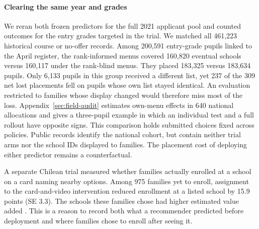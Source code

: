 \paragraph{Clearing the same year and grades}
We reran both frozen predictors for the full 2021 applicant pool and counted outcomes for the entry grades targeted in the trial. We matched all 461,223 historical course or no-offer records. Among 200,591 entry-grade pupils linked to the April register, the rank-informed menus covered 160,820 eventual schools versus 160,117 under the rank-blind menus. They placed 183,325 versus 183,634 pupils. Only 6,133 pupils in this group received a different list, yet 237 of the 309 net lost placements fell on pupils whose own list stayed identical. An evaluation restricted to families whose display changed would therefore miss most of the loss. Appendix~\ref{sec:field-audit} estimates own-menu effects in 640 national allocations and gives a three-pupil example in which an individual test and a full rollout have opposite signs. This comparison holds submitted choices fixed across policies. Public records identify the national cohort, but contain neither trial arms nor the school IDs displayed to families. The placement cost of deploying either predictor remains a counterfactual.

A separate Chilean trial measured whether families actually enrolled at a school on a card naming nearby options. Among 975 families yet to enroll, assignment to the card-and-video intervention reduced enrollment at a listed school by 15.9 points (SE 3.3). The schools these families chose had higher estimated value added \citep{informedEquilibrium}. This is a reason to record both what a recommender predicted before deployment and where families chose to enroll after seeing it.
